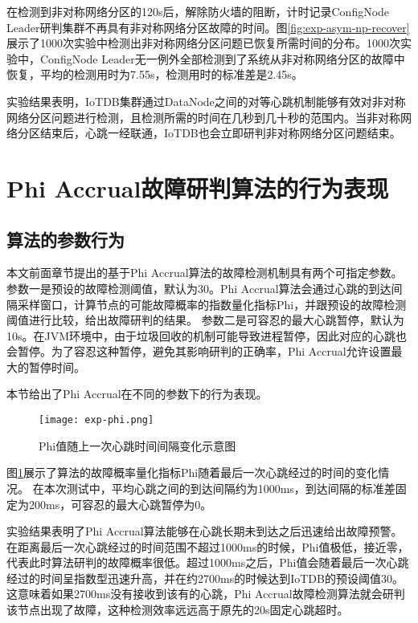 在检测到非对称网络分区的120s后，解除防火墙的阻断，计时记录ConfigNode Leader研判集群不再具有非对称网络分区故障的时间。图\ref{fig:exp-asym-np-recover}展示了1000次实验中检测出非对称网络分区问题已恢复所需时间的分布。1000次实验中，ConfigNode Leader无一例外全部检测到了系统从非对称网络分区的故障中恢复，平均的检测用时为7.55s，检测用时的标准差是2.45s。

实验结果表明，IoTDB集群通过DataNode之间的对等心跳机制能够有效对非对称网络分区问题进行检测，且检测所需的时间在几秒到几十秒的范围内。当非对称网络分区结束后，心跳一经联通，IoTDB也会立即研判非对称网络分区问题结束。


\section{Phi Accrual故障研判算法的行为表现}

\subsection{算法的参数行为}

本文前面章节提出的基于Phi Accrual算法的故障检测机制具有两个可指定参数。
参数一是预设的故障检测阈值，默认为30。Phi Accrual算法会通过心跳的到达间隔采样窗口，计算节点的可能故障概率的指数量化指标Phi，并跟预设的故障检测阈值进行比较，给出故障研判的结果。
参数二是可容忍的最大心跳暂停，默认为10s。在JVM环境中，由于垃圾回收的机制可能导致进程暂停，因此对应的心跳也会暂停。为了容忍这种暂停，避免其影响研判的正确率，Phi Accrual允许设置最大的暂停时间。

本节给出了Phi Accrual在不同的参数下的行为表现。

\begin{figure}
    \centering
    \texttt{[image: exp-phi.png]}
    \caption{Phi值随上一次心跳时间间隔变化示意图}
    \label{fig:exp-phi}
\end{figure}

图\ref{fig:exp-phi}展示了算法的故障概率量化指标Phi随着最后一次心跳经过的时间的变化情况。
在本次测试中，平均心跳之间的到达间隔约为1000ms，到达间隔的标准差固定为200ms，可容忍的最大心跳暂停为0。

实验结果表明了Phi Accrual算法能够在心跳长期未到达之后迅速给出故障预警。在距离最后一次心跳经过的时间范围不超过1000ms的时候，Phi值极低，接近零，代表此时算法研判的故障概率很低。超过1000ms之后，Phi值会随着最后一次心跳经过的时间呈指数型迅速升高，并在约2700ms的时候达到IoTDB的预设阈值30。这意味着如果2700ms没有接收到该有的心跳，Phi Accrual故障检测算法就会研判该节点出现了故障，这种检测效率远远高于原先的20s固定心跳超时。


